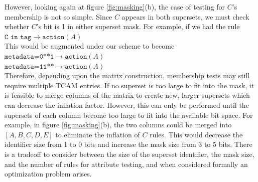 However, looking again at figure \ref{fig:masking}(b), the case of testing for $C$'s membership is not so simple. Since $C$ appears in both supersets, we must check whether $C$'s bit is 1 in either superset mask. For example, if we had the rule\\
\noindent
{%
$\texttt{C in tag} \rightarrow \texttt{action}(A)$\\
}
This would be augmented under our scheme to become\\
\noindent
{%
$\texttt{metadata=0**1} \rightarrow \texttt{action}(A)$\\
$\texttt{metadata=11**} \rightarrow \texttt{action}(A)$\\
}
Therefore, depending upon the matrix construction, membership tests may still require multiple TCAM entries. If no superset is too large to fit into the mask, it is feasible to merge columns of the matrix to create new, larger supersets which can decrease the inflation factor. However, this can only be performed until the supersets of each column become too large to fit into the available bit space. For example, in figure \ref{fig:masking}(b), the two columns could be merged into $[A,B,C,D,E]$ to eliminate the inflation of $C$ rules. This would decrease the identifier size from 1 to 0 bits and increase the mask size from 3 to 5 bits. There is a 
tradeoff to consider between the size of the superset identifier, the mask size, and the number of rules for attribute testing, and when considered formally an optimization problem arises.

